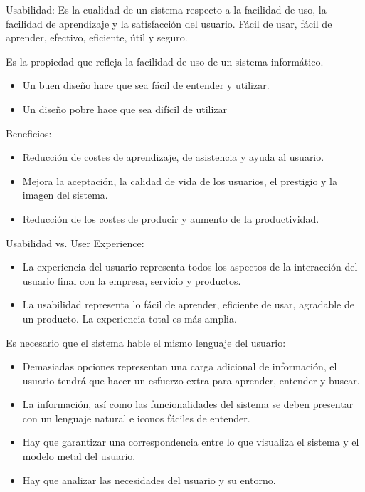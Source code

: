 \documentclass[12pt, twoside, openright]{report} %
\begin{document}
  
    Usabilidad: Es la cualidad de un sistema respecto a la facilidad de
    uso, la facilidad de aprendizaje y la satisfacción del usuario.
    Fácil de usar, fácil de aprender, efectivo, eficiente, útil y
    seguro.

	Es la propiedad que refleja la facilidad de uso de un sistema
    informático.

    \begin{itemize}
    
    \item
      Un buen diseño hace que sea fácil de entender y utilizar.
    \item
      Un diseño pobre hace que sea difícil de utilizar
    \end{itemize}

	Beneficios:

    \begin{itemize}
    
    \item
      Reducción de costes de aprendizaje, de asistencia y ayuda al
      usuario.
    \item
      Mejora la aceptación, la calidad de vida de los usuarios, el
      prestigio y la imagen del sistema.
    \item
      Reducción de los costes de producir y aumento de la productividad.
    \end{itemize}

	Usabilidad vs. User Experience:

    \begin{itemize}
    
    \item
      La experiencia del usuario representa todos los aspectos de la
      interacción del usuario final con la empresa, servicio y
      productos.
    \item
      La usabilidad representa lo fácil de aprender, eficiente de usar,
      agradable de un producto. La experiencia total es más amplia.
    \end{itemize}
\pagebreak
    Es necesario que el sistema hable el mismo lenguaje del usuario:

    \begin{itemize}
    
    \item
      Demasiadas opciones representan una carga adicional de
      información, el usuario tendrá que hacer un esfuerzo extra para
      aprender, entender y buscar.
    \item
      La información, así como las funcionalidades del sistema se deben
      presentar con un lenguaje natural e iconos fáciles de entender.
    \item
      Hay que garantizar una correspondencia entre lo que visualiza el
      sistema y el modelo metal del usuario.
    \item
      Hay que analizar las necesidades del usuario y su entorno.
    \end{itemize}
\end{document}
